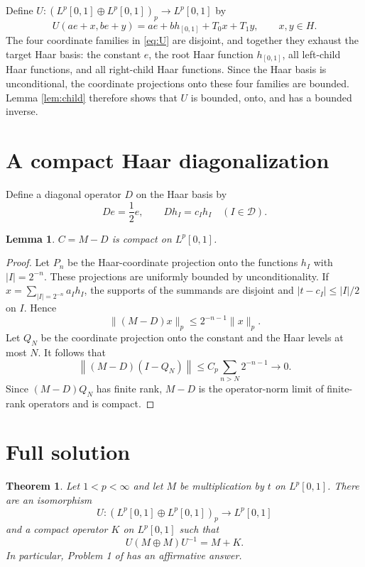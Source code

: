 \documentclass[11pt]{article}
\newtheorem{theorem}{Theorem}
\newtheorem{lemma}{Lemma}
\newcommand{\Lp}{L^p[0,1]}
\newcommand{\Dcal}{\mathcal D}
\begin{document}
Define $U:(\Lp\oplus\Lp)_p\to\Lp$ by
\begin{equation}\label{eq:U}
 U(ae+x,be+y)=ae+b h_{[0,1]}+T_0x+T_1y,
 \qquad x,y\in H.
\end{equation}
The four coordinate families in \eqref{eq:U} are disjoint, and together they
exhaust the target Haar basis: the constant $e$, the root Haar function
$h_{[0,1]}$, all left-child Haar functions, and all right-child Haar
functions. Since the Haar basis is unconditional, the coordinate projections
onto these four families are bounded. Lemma \ref{lem:child} therefore shows
that $U$ is bounded, onto, and has a bounded inverse.

\section{A compact Haar diagonalization}

Define a diagonal operator $D$ on the Haar basis by
\begin{equation}\label{eq:D}
  De=\frac12e,
  \qquad
  Dh_I=c_Ih_I \quad(I\in\Dcal).
\end{equation}

\begin{lemma}\label{lem:compactdiag}
$C=M-D$ is compact on $\Lp$.
\end{lemma}

\begin{proof}
Let $P_n$ be the Haar-coordinate projection onto the functions $h_I$ with
$|I|=2^{-n}$. These projections are uniformly bounded by unconditionality.
If $x=\sum_{|I|=2^{-n}}a_Ih_I$, the supports of the summands are disjoint and
$|t-c_I|\le |I|/2$ on $I$. Hence
\[
 \|(M-D)x\|_p\le 2^{-n-1}\|x\|_p.
\]
Let $Q_N$ be the coordinate projection onto the constant and the Haar levels
at most $N$. It follows that
\[
 \left\|(M-D)(I-Q_N)\right\|
 \le C_p\sum_{n>N}2^{-n-1}\longrightarrow0.
\]
Since $(M-D)Q_N$ has finite rank, $M-D$ is the operator-norm limit of
finite-rank operators and is compact.
\end{proof}

\section{Full solution}

\begin{theorem}\label{thm:main}
Let $1<p<\infty$ and let $M$ be multiplication by $t$ on $L^p[0,1]$. There
are an isomorphism
\[
 U:(L^p[0,1]\oplus L^p[0,1])_p\longrightarrow L^p[0,1]
\]
and a compact operator $K$ on $L^p[0,1]$ such that
\[
  U(M\oplus M)U^{-1}=M+K.
\]
In particular, Problem 1 of \cite{Boedihardjo} has an affirmative answer.
\end{theorem}
\end{document}
